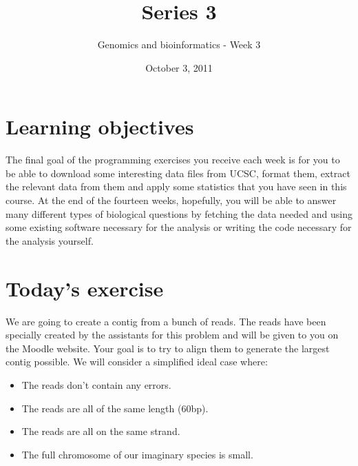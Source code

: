 \documentclass[a4paper,11pt]{article}
\title{Series 3}
\date{October 3, 2011}
\author{Genomics and bioinformatics - Week 3}
\begin{document}
\maketitle

\section{Learning objectives}
The final goal of the programming exercises you receive each week is for you to be able to download some interesting data files from UCSC, format them, extract the relevant data from them and apply some statistics that you have seen in this course. At the end of the fourteen weeks, hopefully, you will be able to answer many different types of biological questions by fetching the data needed and using some existing software necessary for the analysis or writing the code necessary for the analysis yourself.

\section{Today's exercise}
We are going to create a contig from a bunch of reads. The reads have been specially created by the assistants for this problem and will be given to you on the Moodle website. Your goal is to try to align them to generate the largest contig possible. We will consider a simplified ideal case where:
\begin{itemize}
\item The reads don't contain any errors.
\item The reads are all of the same length (60bp).
\item The reads are all on the same strand.
\item The full chromosome of our imaginary species is small.
\end{itemize}
\end{document}
